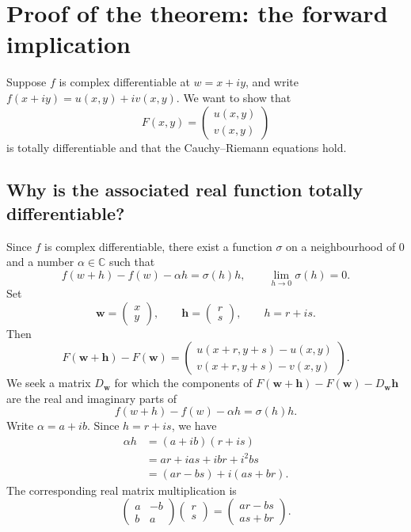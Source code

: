 \documentclass[11pt]{article}
\newcommand{\C}{\mathbb C}
\newcommand{\ww}{\mathbf w}
\newcommand{\hh}{\mathbf h}
\begin{document}
\section{Proof of the theorem: the forward implication}
Suppose $f$ is complex differentiable at $w=x+iy$, and write
$f(x+iy)=u(x,y)+iv(x,y)$. We want to show that
\[
 F(x,y)=\begin{pmatrix}u(x,y)\\v(x,y)\end{pmatrix}
\]
is totally differentiable and that the Cauchy--Riemann equations hold.

\subsection{Why is the associated real function totally differentiable?}
Since $f$ is complex differentiable, there exist a function $\sigma$ on
a neighbourhood of $0$ and a number $\alpha\in\C$ such that
\[
 f(w+h)-f(w)-\alpha h=\sigma(h)h,
 \qquad \lim_{h\to0}\sigma(h)=0.
\]
Set
\[
 \ww=\begin{pmatrix}x\\y\end{pmatrix},\qquad
 \hh=\begin{pmatrix}r\\s\end{pmatrix},\qquad h=r+is.
\]
Then
\[
 F(\ww+\hh)-F(\ww)=
 \begin{pmatrix}
 u(x+r,y+s)-u(x,y)\\
 v(x+r,y+s)-v(x,y)
 \end{pmatrix}.
\]
We seek a matrix $D_{\ww}$ for which the components of
$F(\ww+\hh)-F(\ww)-D_{\ww}\hh$ are the real and imaginary parts of
\[
 f(w+h)-f(w)-\alpha h=\sigma(h)h.
\]
Write $\alpha=a+ib$. Since $h=r+is$, we have
\begin{align*}
 \alpha h&=(a+ib)(r+is)\\
 &=ar+ias+ibr+i^2bs\\
 &=(ar-bs)+i(as+br).
\end{align*}
The corresponding real matrix multiplication is
\[
 \begin{pmatrix}a&-b\\b&a\end{pmatrix}
 \begin{pmatrix}r\\s\end{pmatrix}
 =\begin{pmatrix}ar-bs\\as+br\end{pmatrix}.
\]
\end{document}
